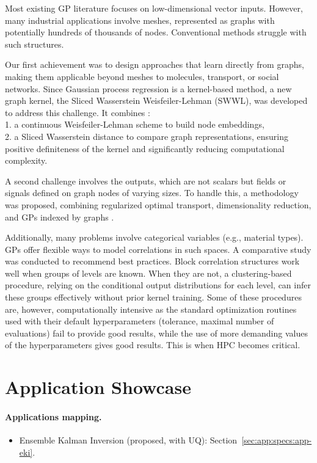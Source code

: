 Most existing GP literature focuses on low-dimensional vector inputs. However, many industrial applications involve meshes, represented as graphs with potentially hundreds of thousands of nodes. Conventional methods struggle with such structures.

Our first achievement was to design approaches that learn directly from graphs, making them applicable beyond meshes to molecules, transport, or social networks.
Since Gaussian process regression is a kernel-based method,
a new graph kernel, the Sliced Wasserstein Weisfeiler-Lehman (SWWL), was developed to address this challenge. It combines \cite{carpintero2024}:\\
	1.	a continuous Weisfeiler-Lehman scheme to build node embeddings,\\
	2.	a Sliced Wasserstein distance to compare graph representations, ensuring positive definiteness of the kernel and significantly reducing computational complexity.

A second challenge involves the outputs, which are not scalars but fields or signals defined on graph nodes of varying sizes. To handle this, a methodology was proposed, combining regularized optimal transport, dimensionality reduction, and GPs indexed by graphs \cite{carpintero2025}.

Additionally, many problems involve categorical variables (e.g., material types). GPs offer flexible ways to model correlations in such spaces. A comparative study was conducted to recommend best practices. Block correlation structures work well when groups of levels are known. When they are not, a clustering-based procedure, relying on the conditional output distributions for each level, can infer these groups effectively without prior kernel training.
Some of these procedures are, however, computationally intensive as the standard optimization routines used with their default hyperparameters (tolerance, maximal number of evaluations) fail to provide good results, while the use of more demanding values of the hyperparameters gives good results. This is when HPC becomes critical.

\section{Application Showcase}
%   

\paragraph{Applications mapping.}
\begin{itemize}
	\item Ensemble Kalman Inversion (proposed, with UQ): Section~\ref{sec:app:specs:app-eki}.
\end{itemize}


